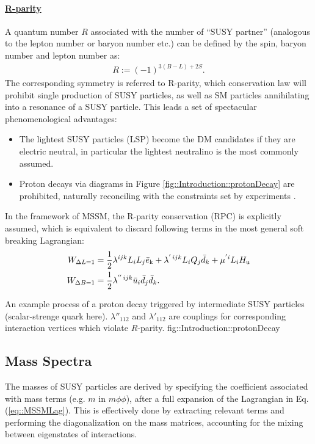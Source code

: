 \paragraph{\underline{R-parity}}  \mbox{}
A quantum number $R$ associated with the number of ``SUSY partner'' (analogous to the lepton number or baryon number etc.) can be defined by the spin, baryon number and lepton number as:
\begin{align}
R := (-1)^{3(B-L)+2S}.
\end{align}
The corresponding symmetry is referred to R-parity, which conservation law will prohibit single production of SUSY particles, as well as SM particles annihilating into a resonance of a SUSY particle. 
This leads a set of spectacular phenomenological advantages: 
\begin{itemize}
\item The lightest SUSY particles (LSP) become the DM candidates if they are electric neutral, in particular the lightest neutralino is the most commonly assumed. 
\item Proton decays via diagrams in Figure \ref{fig::Introduction::protonDecay} are prohibited, naturally reconciling with the constraints set by experiments \cite{protonDecaySuperK}.
\end{itemize}
In the framework of MSSM, the R-parity conservation (RPC) is explicitly assumed, which is equivalent to discard following terms in the most general soft breaking Lagrangian:
\begin{align}
W_{\Delta L=1} & = \frac{1}{2} \lambda^{ijk} L_i L_j \bar{e}_\mathrm{k} + \lambda^{'\, ijk} L_i Q_j \bar{d}_k + \mu^{'i} L_i H_{\mathrm{u}} \nonumber \\
W_{\Delta B=1} & = \frac{1}{2} \lambda^{''\, ijk} \bar{u}_i  \bar{d}_j  \bar{d}_k.
\label{eq::RPVterms}
\end{align}

{An example process of a proton decay triggered by intermediate SUSY particles (scalar-strenge quark here). $\lambda''_{112}$ and $\lambda'_{112}$ are couplings for corresponding interaction vertices which violate $R$-parity.}
{fig::Introduction::protonDecay}




\subsection{Mass Spectra}
The masses of SUSY particles are derived by specifying the coefficient associated with mass terms (e.g. $m$ in $m\phi\phi$), after a full expansion of the Lagrangian in Eq. (\ref{eq::MSSMLag}). This is effectively done by extracting relevant terms and performing the diagonalization on the mass matrices, accounting for the mixing between eigenstates of interactions. \\

